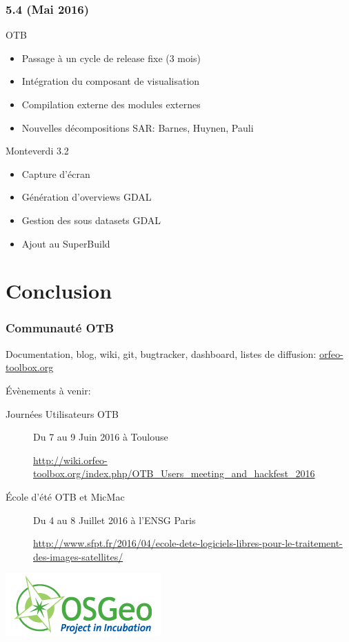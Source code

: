 \documentclass[8pt]{beamer}
\begin{document}
\begin{frame}
\frametitle{5.4 (Mai 2016)}
\begin{block}{OTB}
\begin{itemize}
\item Passage à un cycle de release fixe (3 mois)
\item Intégration du composant de visualisation
\item Compilation externe des modules externes
\item Nouvelles décompositions SAR: Barnes, Huynen, Pauli
\end{itemize}
\end{block}

\begin{block}{Monteverdi 3.2}
\begin{itemize}
\item Capture d'écran
\item Génération d'overviews GDAL
\item Gestion des sous datasets GDAL
\item Ajout au SuperBuild
\end{itemize}
\end{block}
\end{frame}

\section*{Conclusion}

\begin{frame}
\frametitle{Communauté OTB}
\begin{center}
Documentation, blog, wiki, git, bugtracker, dashboard, listes de diffusion:
{\huge\textcolor{red}{\href{http://www.orfeo-toolbox.org}{orfeo-toolbox.org}}}
\end{center}

\begin{block}{Évènements à venir:}
\begin{description}
\item[Journées Utilisateurs OTB] {Du 7 au 9 Juin 2016 à Toulouse}
\item[] {{\footnotesize\url{http://wiki.orfeo-toolbox.org/index.php/OTB\_Users\_meeting\_and\_hackfest\_2016}}}
\item[École d’été OTB et MicMac] {Du 4 au 8 Juillet 2016 à l'ENSG Paris}
\item[] {{\footnotesize\url{http://www.sfpt.fr/2016/04/ecole-dete-logiciels-libres-pour-le-traitement-des-images-satellites/}}}
\end{description}
\end{block}
\begin{center}
\includegraphics[scale=.3]{../OTB-General/images/OSGeo_incubation.png}
\end{center}
\end{frame}
\end{document}
